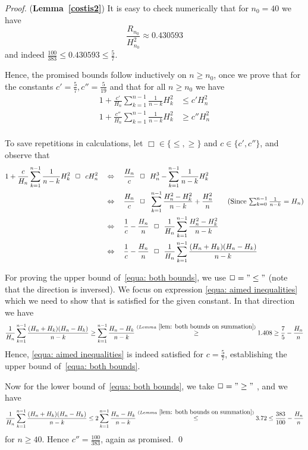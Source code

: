 \documentclass[11pt]{llncs}
\begin{document}
\begin{proof} ({\bf Lemma~\ref{costis2}})
It is easy to check numerically that for $n_0=40$ we have
$$
\frac{R_{n_0}}{H^2_{n_0}} \approx 0.430593
$$
and indeed $\frac{100}{383} \leq 0.430593 \leq \frac{5}{7}$.

Hence, the promised bounds follow inductively on $n\geq n_0$, once we prove that for the constants $c'=\frac57,c''=\frac5{19}$ and that for all $n\geq n_0$ we have
\begin{align*}
1 + \frac {c'}{H_n}\sum_{k=1}^{n-1}\frac{1}{n-k}H^2_k 
&\leq {c'} H^2_n \\
1 + \frac{c''}{H_n}\sum_{k=1}^{n-1}\frac{1}{n-k}H^2_k 
&\geq c'' H^2_n \\
\end{align*}

To save repetitions in calculations, let $\Box \in \{\leq, \geq\}$ and $c \in \{c',c''\}$, and observe that 
\begin{align}
1 + \frac {c}{H_n}\sum_{k=1}^{n-1}\frac{1}{n-k}H^2_k ~~\Box~~ c H^2_n 
~~~&\Leftrightarrow ~~~
\frac{H_n}{c} ~~\Box~~ H^3_n -  \sum_{k=1}^{n-1}\frac{1}{n-k}H^2_k \notag \\
~~~&\Leftrightarrow ~~~
\frac{H_n}{c} ~~\Box~~ \sum_{k=1}^{n-1}\frac{H^2_n-H^2_k}{n-k} + \frac{H_n^2}{n} \tag{Since $\sum_{k=0}^{n-1}\frac1{n-k}=H_n$}\\
~~~&\Leftrightarrow ~~~
\frac{1}{c} - \frac{H_n}n ~~\Box~~ \frac1{H_n}\sum_{k=1}^{n-1}\frac{H^2_n-H^2_k}{n-k} \notag \\
~~~&\Leftrightarrow ~~~
\frac{1}{c} - \frac{H_n}n ~~\Box~~ \frac1{H_n}\sum_{k=1}^{n-1}\frac{(H_n+H_k)(H_n-H_k)}{n-k} \label{equa: aimed inequalities} \end{align}


For proving the upper bound of~\eqref{equa: both bounds}, we use $\Box="\leq"$ (note that the direction is inversed). We focus on expression \eqref{equa: aimed inequalities} which we need to show that is satisfied for the given constant. In that direction we have
$$
\frac1{H_n}\sum_{k=1}^{n-1}\frac{(H_n+H_k)(H_n-H_k)}{n-k} 
\geq
\sum_{k=1}^{n-1}\frac{H_n-H_k}{n-k} 
\stackrel{(Lemma~\ref{lem: both bounds on summation})}{\geq} 1.408 \geq \frac75-\frac{H_n}n
$$
Hence, \eqref{equa: aimed inequalities} is indeed satisfied for $c=\frac57$, establishing  the upper bound of~\eqref{equa: both bounds}.

Now for the lower bound of~\eqref{equa: both bounds}, we take $\Box="\geq"$ , and we have 
$$
\frac1{H_n}\sum_{k=1}^{n-1}\frac{(H_n+H_k)(H_n-H_k)}{n-k} 
\leq
2 \sum_{k=1}^{n-1}\frac{H_n-H_k}{n-k} 
\stackrel{(Lemma~\ref{lem: both bounds on summation})}{\leq} 3.72 \leq \frac{383}{100}-\frac{H_n}n
$$
for $n\geq 40$. Hence $c''=\frac{100}{383}$, again as promised. 
\qed
\end{proof}
\end{document}
